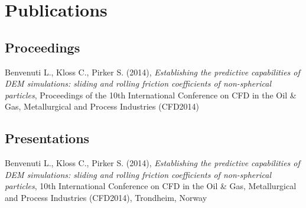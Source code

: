 \chapter*{Publications}
\label{cap:publications}
\section*{Proceedings}

\noindent
Benvenuti L., Kloss C., Pirker S. (2014), \emph{Establishing the predictive capabilities of DEM 
simulations: sliding and rolling friction coefficients of non-spherical particles}, 
Proceedings of the 10th International Conference on CFD 
in the Oil \& Gas, Metallurgical and Process Industries (CFD2014)
\vspace{1ex}



\section*{Presentations}

\noindent
Benvenuti L., Kloss C., Pirker S. (2014), \emph{Establishing the predictive capabilities of DEM 
simulations: sliding and rolling friction coefficients of non-spherical particles}, 
10th International Conference on CFD 
in the Oil \& Gas, Metallurgical and Process Industries (CFD2014), Trondheim,
Norway
\vspace{1ex}


